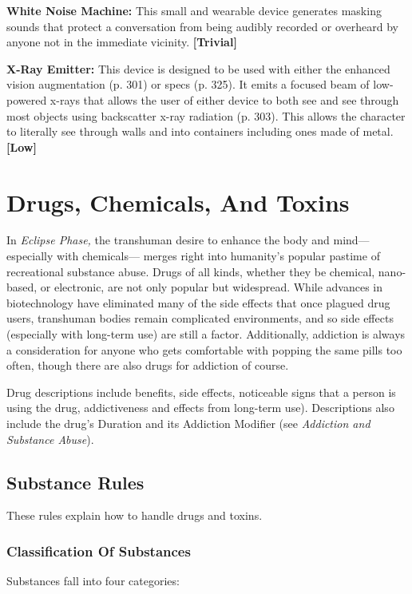 \textbf{White Noise Machine:} This small and wearable 
device generates masking sounds that protect a conversation
from being audibly recorded or overheard
by anyone not in the immediate vicinity. \textbf{[Trivial]}

\textbf{X-Ray Emitter:} This device is designed to be used 
with either the enhanced vision augmentation (p. 
301) or specs (p. 325). It emits a focused beam of 
low-powered x-rays that allows the user of either 
device to both see and see through most objects using 
backscatter x-ray radiation (p. 303). This allows the 
character to literally see through walls and into containers
including ones made of metal. \textbf{[Low]}

\section{Drugs, Chemicals, And Toxins}

In \textit{Eclipse Phase,} the transhuman desire to enhance 
the body and mind—especially with chemicals—
merges right into humanity's popular pastime of 
recreational substance abuse. Drugs of all kinds, 
whether they be chemical, nano-based, or electronic, 
are not only popular but widespread. While advances 
in biotechnology have eliminated many of the side 
effects that once plagued drug users, transhuman 
bodies remain complicated environments, and so side 
effects (especially with long-term use) are still a factor. 
Additionally, addiction is always a consideration for 
anyone who gets comfortable with popping the same 
pills too often, though there are also drugs for addiction
of course.

Drug descriptions include benefits, side effects, noticeable
signs that a person is using the drug, addictiveness
and effects from long-term use). Descriptions also
include the drug's Duration and its Addiction Modifier 
(see \textit{Addiction and Substance Abuse}).

\subsection{Substance Rules}

These rules explain how to handle drugs and toxins.

\subsubsection{Classification Of Substances}

Substances fall into four categories:

